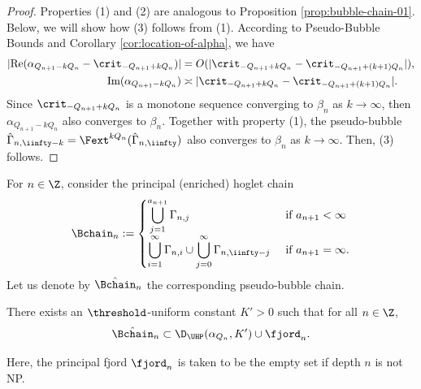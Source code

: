 \documentclass{amsart}
\begin{document}
\begin{proof}
    Properties (1) and (2) are analogous to Proposition \ref{prop:bubble-chain-01}.
    Below, we will show how (3) follows from (1).
    According to Pseudo-Bubble Bounds and Corollary \ref{cor:location-of-alpha}, we have
    \begin{align*}
        |\text{Re} (\alpha_{Q_{n+1}-kQ_n} - \crit_{-Q_{n+1}+kQ_n})|
        &= O( |\crit_{-Q_{n+1}+kQ_n} - \crit_{-Q_{n+1}+(k+1) Q_n}|), \\
        \text{Im} (\alpha_{Q_{n+1}-kQ_n}) &\asymp |\crit_{-Q_{n+1}+kQ_n} - \crit_{-Q_{n+1}+(k+1) Q_n}|.
    \end{align*}
    Since $\crit_{-Q_{n+1}+k Q_n}$ is a monotone sequence converging to $\beta_n$ as $k \to \infty$, then $\alpha_{Q_{n+1}-kQ_n}$ also converges to $\beta_n$.
    Together with property (1), the pseudo-bubble $\hat{\Gamma}_{n,\iinfty-k} = \Fext^{kQ_n}(\hat{\Gamma}_{n,\iinfty})$ also converges to $\beta_n$ as $k \to \infty$.
    Then, (3) follows.
\end{proof}

For $n \in \Z$, consider the principal (enriched) hoglet chain
\begin{align}
\label{eqn:hoglet-chain-old}
    \Bchain_n := 
    \begin{cases}
        \displaystyle \bigcup_{j=1}^{a_{n+1}} \Gamma_{n,j} & \text{ if } a_{n+1}<\infty \\
        \displaystyle \bigcup_{i=1}^{\infty} \Gamma_{n,i} \cup \bigcup_{j=0}^{\infty} \Gamma_{n,\iinfty-j} & \text{ if } a_{n+1} = \infty.
    \end{cases}
\end{align}
Let us denote by $\hat{\Bchain}_n$ the corresponding pseudo-bubble chain.

\begin{lemma}
\label{lem:estimate-enriched-pseudo-bubble-chain}
    There exists an $\threshold$-uniform constant $K'>0$ such that for all $n \in \Z$,
    \[
        \hat{\Bchain}_n \subset \D_{\UHP}(\alpha_{Q_n}, K') \cup \fjord_n.
    \]
\end{lemma}

Here, the principal fjord $\fjord_n$ is taken to be the empty set if depth $n$ is not NP.
\end{document}
